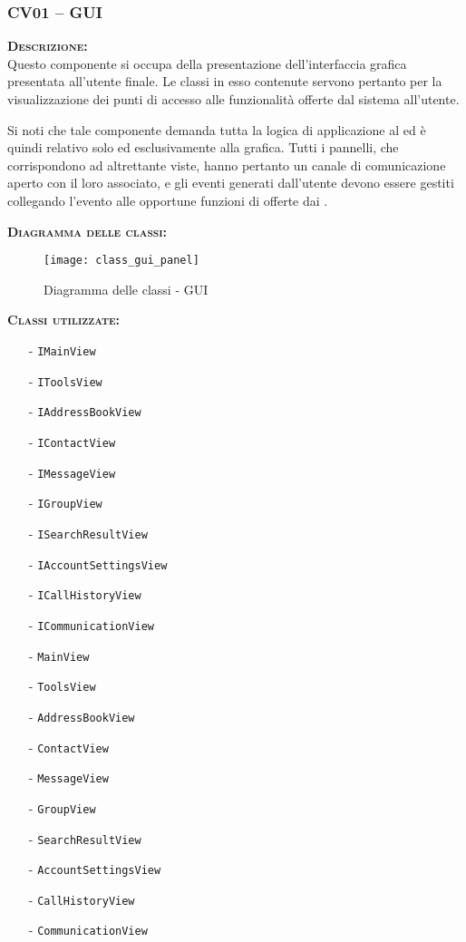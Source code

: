 \subsubsection{CV01 -- GUI}\label{sec:cv01}
\begin{description}
	\item{\scshape\bfseries Descrizione:}\\
Questo componente si occupa della presentazione dell'interfaccia grafica presentata all'utente finale. Le classi in esso contenute servono pertanto per la visualizzazione dei punti di accesso alle funzionalità offerte dal sistema all'utente.

Si noti che tale componente demanda tutta la logica di applicazione al  ed è quindi relativo solo ed esclusivamente alla grafica. Tutti i pannelli, che corrispondono ad altrettante viste, hanno pertanto un canale di comunicazione aperto con il  loro associato, e gli eventi generati dall'utente devono essere gestiti collegando l'evento alle opportune funzioni di  offerte dai .

	\item{\scshape\bfseries Diagramma delle classi:}
  \begin{figure}[H]
    \centering
    
   \texttt{[image: class\_gui\_panel]}
    \caption{Diagramma delle classi - GUI}\label{fig:gui}
  \end{figure}

	\item{\scshape\bfseries Classi utilizzate:} 
	\begin{itemize}[noitemsep,nolistsep]
		\item[-] \texttt{IMainView}
		\item[-] \texttt{IToolsView}
		\item[-] \texttt{IAddressBookView}
		\item[-] \texttt{IContactView}
		\item[-] \texttt{IMessageView}
		\item[-] \texttt{IGroupView}
		\item[-] \texttt{ISearchResultView}
		\item[-] \texttt{IAccountSettingsView}
		\item[-] \texttt{ICallHistoryView}
		\item[-] \texttt{ICommunicationView}
		\item[-] \texttt{MainView}
		\item[-] \texttt{ToolsView}
		\item[-] \texttt{AddressBookView}
		\item[-] \texttt{ContactView}
		\item[-] \texttt{MessageView}
		\item[-] \texttt{GroupView}
		\item[-] \texttt{SearchResultView}
		\item[-] \texttt{AccountSettingsView}
		\item[-] \texttt{CallHistoryView}
		\item[-] \texttt{CommunicationView}
	\end{itemize}  
\end{description}

